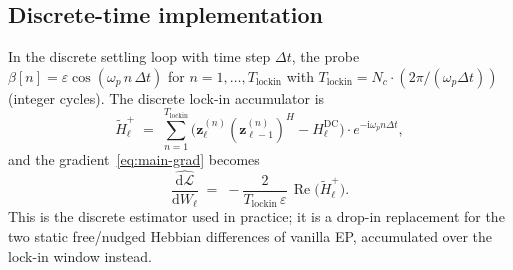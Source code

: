 \documentclass[11pt]{article}
\newcommand{\im}{\mathrm{i}}
\newcommand{\dd}{\mathrm{d}}
\newcommand{\dt}{\Delta t}
\theoremstyle{definition}
\DeclareMathOperator{\Real}{Re}
\begin{document}
\subsection{Discrete-time implementation}
In the discrete settling loop with time step $\dt$, the probe
$\beta[n] = \varepsilon\cos(\omega_p\,n\,\dt)$ for
$n = 1,\dots,T_\text{lockin}$ with
$T_\text{lockin} = N_c \cdot (2\pi/(\omega_p\dt))$
(integer cycles).  The discrete lock-in accumulator is
\begin{equation}\label{eq:disc-acc}
  \tilde H_\ell^{+}
  \;=\;
  \sum_{n=1}^{T_\text{lockin}}
    \bigl(\bm{z}_\ell^{(n)} (\bm{z}_{\ell-1}^{(n)})^H - H_\ell^{\text{DC}}\bigr)
    \cdot e^{-\im\omega_p n \dt},
\end{equation}
and the gradient~\eqref{eq:main-grad} becomes
\begin{equation}\label{eq:disc-grad}
  \widehat{\frac{\dd\mathcal{L}}{\dd W_\ell}}
  \;=\;
  -\frac{2}{T_\text{lockin}\,\varepsilon}\,\Real\bigl(\tilde H_\ell^{+}\bigr).
\end{equation}
This is the discrete estimator used in practice; it is a drop-in
replacement for the two static free/nudged Hebbian differences of
vanilla EP, accumulated over the lock-in window instead.
\end{document}

